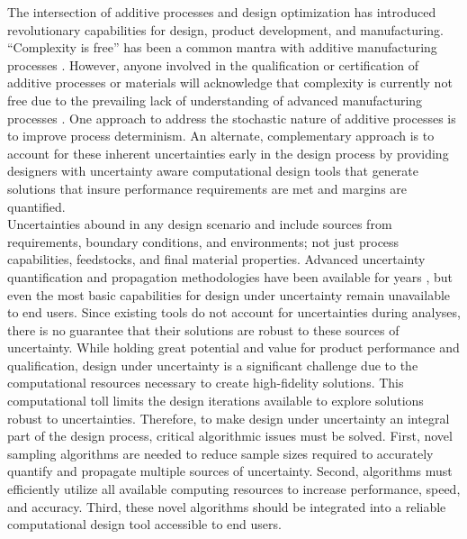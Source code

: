 The intersection of additive processes and design optimization has introduced revolutionary capabilities for design, product development, and manufacturing. ``Complexity is free'' has been a common mantra with additive manufacturing processes \cite{jared2017additive}. However, anyone involved in the qualification or certification of additive processes or materials will acknowledge that complexity is currently not free due to the prevailing lack of understanding of advanced manufacturing processes \cite{jared2017additive}. One approach to address the stochastic nature of additive processes is to improve process determinism. An alternate, complementary approach is to account for these inherent uncertainties early in the design process by providing designers with uncertainty aware computational design tools that generate solutions that insure performance requirements are met and margins are quantified. \\

Uncertainties abound in any design scenario and include sources from requirements, boundary conditions, and environments; not just process capabilities, feedstocks, and final material properties. Advanced uncertainty quantification and propagation methodologies have been available for years \cite{ghanem2003stochastic,babuska2004galerkin,babuvska2007stochastic}, but even the most basic capabilities for design under uncertainty \cite{frangopol1995reliability,maute2003reliability,kharmanda2004reliability} remain unavailable to end users. Since existing tools do not account for uncertainties during analyses, there is no guarantee that their solutions are robust to these sources of uncertainty. While holding great potential and value for product performance and qualification, design under uncertainty is a significant challenge due to the computational resources necessary to create high-fidelity solutions. This computational toll limits the design iterations available to explore solutions robust to uncertainties. Therefore, to make design under uncertainty an integral part of the design process, critical algorithmic issues must be solved. First, novel sampling algorithms are needed to reduce sample sizes required to accurately quantify and propagate multiple sources of uncertainty. Second, algorithms must efficiently utilize all available computing resources to increase performance, speed, and accuracy. Third, these novel algorithms should be integrated into a reliable computational design tool accessible to end users. \\

